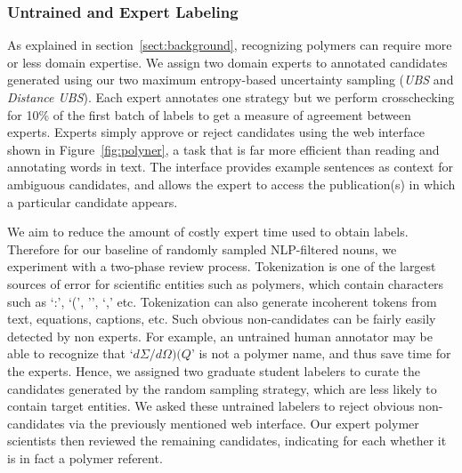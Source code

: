 \subsubsection{Untrained and Expert Labeling}
As explained in section~\ref{sect:background}, recognizing polymers can require more or less domain expertise.
We assign two domain experts to annotated candidates generated using our two maximum entropy-based uncertainty sampling (\textit{UBS} and \textit{Distance UBS}). 
Each expert annotates one strategy but we perform crosschecking for 10\% of the first batch of labels to get a measure of agreement between experts. 
Experts simply approve or reject candidates using the web interface shown in Figure~\ref{fig:polyner},
a task that is far more efficient than reading and annotating words in text.
The interface
provides example sentences as context for ambiguous candidates,
and allows the expert to access the publication(s) in which a particular candidate
appears. %

We aim to reduce the amount of costly expert time used to obtain labels.
Therefore for our baseline of randomly sampled NLP-filtered nouns, we experiment with a two-phase review process.
Tokenization is one of the largest sources of error for scientific entities such as polymers, 
which contain characters such as `:', `(',
'\textendash', `,' etc. 
Tokenization can also generate incoherent tokens from text, equations, captions, etc.
Such obvious non-candidates can be fairly easily detected by non experts.
For example, an untrained human annotator may be able to recognize that `$d\Sigma/d\Omega)(Q$' is not a polymer name, and thus save time for the experts.
Hence, we assigned two graduate student labelers to curate the candidates generated by the random sampling strategy, which are less likely to contain target entities.
We asked these untrained labelers to reject obvious non-candidates via the previously mentioned web interface. 
Our expert polymer scientists then reviewed the remaining
candidates, indicating for each whether it is in fact a polymer referent. %



